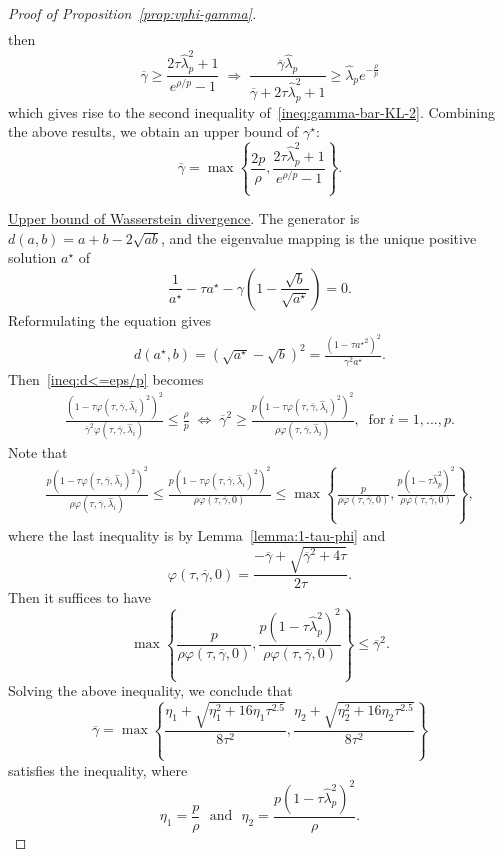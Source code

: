 \documentclass[11pt]{article}
\newcommand{\opt}{^\star}
\newcommand{\wh}{\widehat}
\begin{document}
\begin{proof}[Proof of Proposition~\ref{prop:vphi-gamma}]
\begin{align*}
    \end{align*}
    then 
    \[
        \overline{\gamma}\geq \frac{2\tau \wh\lambda_p^2+1}{e^{ \rho/p}-1}\;\Rightarrow\; \frac{\overline{\gamma}\wh\lambda_p}{\overline{\gamma}+2\tau \wh\lambda_p^2+1} \geq \wh\lambda_p e^{-\frac{ \rho}{p}}
    \]
which gives rise to the second inequality of~\eqref{ineq:gamma-bar-KL-2}. Combining the above results, we obtain an upper bound of $\gamma\opt$: 
    \[
        \overline{\gamma} = \max\left\{\frac{2p}{ \rho},\frac{2\tau \wh\lambda_p^2+1}{e^{ \rho/p}-1}\right\}.
    \]

    \underline{Upper bound of Wasserstein divergence}. The generator is $d(a,b) = a+b-2\sqrt{ab}$, and the eigenvalue mapping is the unique positive solution $a\opt$ of 
    \[
        \frac{1}{a\opt} - \tau a\opt - \gamma\left(1-\frac{\sqrt{b}}{\sqrt{a\opt}}\right) = 0.
    \]
    Reformulating the equation gives
    \begin{align*}
        d(a\opt,b)=\left(\sqrt{a\opt}-\sqrt{b}\right)^2 = \frac{(1-\tau {a\opt}^2)^2}{\gamma^2 a\opt}.
    \end{align*}
    Then~\eqref{ineq:d<=eps/p} becomes 
    \begin{align*}\label{ineq:gamma-bar-W}
        \frac{(1-\tau \varphi(\tau,\overline{\gamma},\wh\lambda_i)^2)^2}{\overline{\gamma}^2 \varphi(\tau,\overline{\gamma},\wh\lambda_i)}\leq \frac{ \rho}{p}\;\Longleftrightarrow\;
        \overline{\gamma}^2 \geq \frac{p(1-\tau \varphi(\tau,\overline{\gamma},\wh\lambda_i)^2)^2}{ \rho\varphi(\tau,\overline{\gamma},\wh\lambda_i)}
        ,\;\; \text{for}\; i=1,...,p.
    \end{align*}
    Note that 
    \begin{align*}
        \frac{p(1-\tau \varphi(\tau,\overline{\gamma},\wh\lambda_i)^2)^2}{ \rho\varphi(\tau,\overline{\gamma},\wh\lambda_i)} \leq \frac{p(1-\tau \varphi(\tau,\overline{\gamma},\wh\lambda_i)^2)^2}{ \rho\varphi(\tau,\overline{\gamma},0)} \leq \max\left\{\frac{p}{ \rho \varphi(\tau,\overline{\gamma},0)}, \frac{p(1-\tau \wh\lambda_p^2)^2}{ \rho \varphi(\tau,\overline{\gamma},0)}\right\},
    \end{align*}
    where the last inequality is by Lemma~\ref{lemma:1-tau-phi} and 
    \[
        \varphi(\tau,\overline{\gamma},0) = \frac{-\overline{\gamma}+\sqrt{\overline{\gamma}^2+4\tau}}{2\tau}.
    \]
    Then it suffices to have 
    \[
        \max\left\{\frac{p}{ \rho \varphi(\tau,\overline{\gamma},0)}, \frac{p(1-\tau \wh\lambda_p^2)^2}{\rho \varphi(\tau,\overline{\gamma},0)}\right\} \leq \overline{\gamma}^2.
    \]
    Solving the above inequality, we conclude that 
    \[
        \overline{\gamma} = \max\left\{\frac{\eta_1+\sqrt{\eta_1^2+16\eta_1\tau^{2.5}}}{8\tau^2},\frac{\eta_2+\sqrt{\eta_2^2+16\eta_2\tau^{2.5}}}{8\tau^2}\right\}
    \]
    satisfies the inequality, where
    \[
        \eta_1 = \frac{p}{\rho}~~~\text{and}~~~\eta_2 = \frac{p(1-\tau\wh\lambda_p^2)^2}{\rho}.
    \]


\end{proof}
\end{document}

